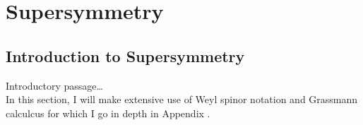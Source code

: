 \documentclass[../main.tex]{subfiles}
\begin{document}
\chapter{Supersymmetry}


\section{Introduction to Supersymmetry}

Introductory passage\ldots\\
In this section, I will make extensive use of Weyl spinor notation and Grassmann calculcus for which I go in depth in Appendix \needcite.
\end{document}
